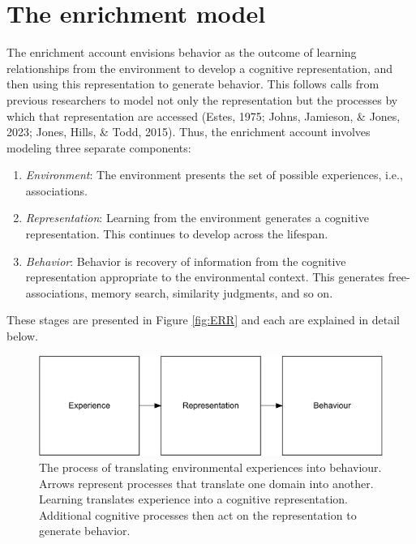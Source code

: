 \documentclass[
  man]{apa6}
\providecommand{\tightlist}{%
  \setlength{\itemsep}{0pt}\setlength{\parskip}{0pt}}
\begin{document}
\hypertarget{the-enrichment-model}{%
\section{The enrichment model}\label{the-enrichment-model}}

The enrichment account envisions behavior as the outcome of learning relationships from the environment to develop a cognitive representation, and then using this representation to generate behavior. This follows calls from previous researchers to model not only the representation but the processes by which that representation are accessed (Estes, 1975; Johns, Jamieson, \& Jones, 2023; Jones, Hills, \& Todd, 2015). Thus, the enrichment account involves modeling three separate components:

\begin{enumerate}
\def\labelenumi{\arabic{enumi}.}
\tightlist
\item
  \emph{Environment}: The environment presents the set of possible experiences, i.e., associations.
\item
  \emph{Representation}: Learning from the environment generates a cognitive representation. This continues to develop across the lifespan.
\item
  \emph{Behavior}: Behavior is recovery of information from the cognitive representation appropriate to the environmental context. This generates free-associations, memory search, similarity judgments, and so on.
\end{enumerate}

These stages are presented in Figure \ref{fig:ERR} and each are explained in detail below.

\begin{figure}
\centering
\includegraphics{Enrichment_files/figure-latex/Figure1-1.pdf}
\caption{\label{fig:Figure1}The process of translating environmental experiences into behaviour. Arrows represent processes that translate one domain into another. Learning translates experience into a cognitive representation. Additional cognitive processes then act on the representation to generate behavior.}
\end{figure}
\end{document}

